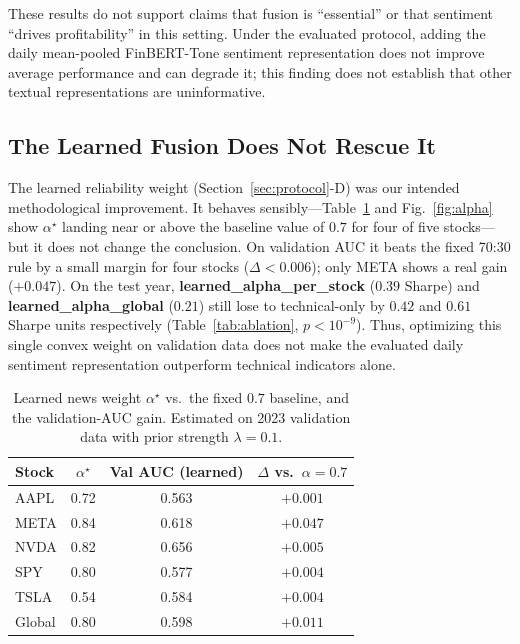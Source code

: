 \documentclass[conference]{IEEEtran}
\begin{document}
These results do not support claims that fusion is ``essential'' or that
sentiment ``drives profitability'' in this setting. Under the evaluated
protocol, adding the daily mean-pooled FinBERT-Tone sentiment representation
does not improve average performance and can degrade it; this finding does
not establish that other textual representations are uninformative.

\subsection{The Learned Fusion Does Not Rescue It}
The learned reliability weight (Section~\ref{sec:protocol}-D) was our intended
methodological improvement. It behaves sensibly---Table~\ref{tab:alpha} and Fig.~\ref{fig:alpha} show
$\alpha^\star$ landing near or above the baseline value of $0.7$ for four of
five stocks---but it does not change the conclusion. On validation AUC it beats
the fixed 70:30 rule by a small margin for four stocks ($\Delta<0.006$);
only META shows a real gain ($+0.047$). On the test year,
\textbf{learned\_alpha\_per\_stock} ($0.39$ Sharpe) and
\textbf{learned\_alpha\_global} ($0.21$) still lose to technical-only by $0.42$
and $0.61$ Sharpe units respectively (Table~\ref{tab:ablation},
$p<10^{-9}$). Thus, optimizing this single convex weight on validation data
does not make the evaluated daily sentiment representation outperform
technical indicators alone.

\begin{table}[t]
\caption{Learned news weight $\alpha^\star$ vs.\ the fixed $0.7$ baseline, and
the validation-AUC gain. Estimated on 2023 validation data with prior strength
$\lambda=0.1$.}
\label{tab:alpha}
\centering
\small
\begin{tabular}{lccc}
\toprule
Stock & $\alpha^\star$ & Val AUC (learned) & $\Delta$ vs.\ $\alpha{=}0.7$ \\
\midrule
AAPL & 0.72 & 0.563 & $+0.001$ \\
META & 0.84 & 0.618 & $+0.047$ \\
NVDA & 0.82 & 0.656 & $+0.005$ \\
SPY  & 0.80 & 0.577 & $+0.004$ \\
TSLA & 0.54 & 0.584 & $+0.004$ \\
\midrule
Global & 0.80 & 0.598 & $+0.011$ \\
\bottomrule
\end{tabular}
\end{table}
\end{document}
